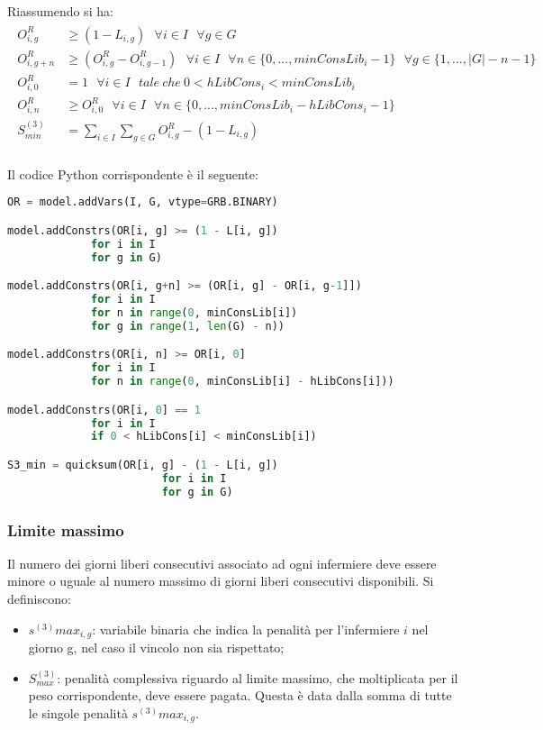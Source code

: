 Riassumendo si ha:
\begin{gather}
\begin{aligned}
O_{i,g}^R &\geq (1 - L_{i,g}) ~~~ \forall i \in I ~~~ \forall g \in G \\
O_{i,g+n}^R &\geq (O_{i,g}^R - O_{i,g-1}^R) ~~~ \forall i \in I ~~~ \forall n \in \{0,...,minConsLib_i - 1\} ~~~ \forall g \in \{1,...,|G| - n - 1\} \\
O_{i,0}^R &= 1 ~~~ \forall i \in I ~~~ tale ~ che ~ 0 < hLibCons_i < minConsLib_i \\
O_{i,n}^R &\geq O_{i,0}^R ~~~ \forall i \in I ~~~ \forall n \in \{0,...,minConsLib_i - hLibCons_i - 1\} \\
S^{(3)}_{min} &= \sum_{i \in I} \sum_{g \in G} O_{i,g}^R - (1 - L_{i,g}) \\
\end{aligned}
\end{gather}

Il codice Python corrispondente è il seguente:
\begin{lstlisting}[language=Python]
OR = model.addVars(I, G, vtype=GRB.BINARY)

model.addConstrs(OR[i, g] >= (1 - L[i, g])
             for i in I
             for g in G)

model.addConstrs(OR[i, g+n] >= (OR[i, g] - OR[i, g-1]])
             for i in I
             for n in range(0, minConsLib[i])
             for g in range(1, len(G) - n))

model.addConstrs(OR[i, n] >= OR[i, 0]
             for i in I
             for n in range(0, minConsLib[i] - hLibCons[i]))

model.addConstrs(OR[i, 0] == 1
             for i in I
             if 0 < hLibCons[i] < minConsLib[i])

S3_min = quicksum(OR[i, g] - (1 - L[i, g])
                        for i in I
                        for g in G)
\end{lstlisting}


\subsubsection{Limite massimo}
Il numero dei giorni liberi consecutivi associato ad ogni infermiere deve essere minore o uguale al numero massimo di giorni liberi consecutivi disponibili.
Si definiscono:
\begin{itemize}
\item $s^{(3)}max_{i, g}$: variabile binaria che indica la penalità per l'infermiere $i$ nel giorno g, nel caso il vincolo non sia rispettato;
\item $S^{(3)}_{max}$: penalità complessiva riguardo al limite massimo, che moltiplicata per il peso corrispondente, deve essere pagata.
Questa è data dalla somma di tutte le singole penalità $s^{(3)}max_{i, g}$.
\end{itemize}

